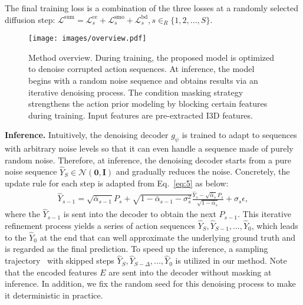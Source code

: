 \documentclass[10pt,twocolumn,letterpaper]{article}
\begin{document}
The final training loss is a combination of the three losses at a randomly selected diffusion step:
$\mathcal{L}^{\mathrm{sum}} = \mathcal{L}^{\mathrm{ce}}_s + \mathcal{L}^{\mathrm{smo}}_s + \mathcal{L}^{\mathrm{bd}}_s, s \in_R \{1,2,...,S\}$.






\begin{figure}[t]
\begin{center}
   \texttt{[image: images/overview.pdf]}
\end{center}
   \caption{Method overview. During training, the proposed model is optimized to denoise corrupted action sequences. At inference, the model begins with a random noise sequence and obtains results via an iterative denoising process. The condition masking strategy strengthens the action prior modeling by blocking certain features during training. Input features are pre-extracted I3D features.}
\label{fig:overview}
\end{figure}

\textbf{Inference.}
Intuitively, the denoising decoder $g_\psi$ is trained to adapt to sequences with arbitrary noise levels so that it can even handle a sequence made of purely random noise.
Therefore, at inference, the denoising decoder starts from a pure noise sequence ${\hat{Y}}_{S} \in \mathcal{N}(\boldsymbol{0}, \boldsymbol{I})$ and gradually reduces the noise.
Concretely, the update rule for each step is adapted from Eq.~\ref{eq:5} as below:
\begin{equation} \label{eq:12}
\begin{split}
{\hat{Y}}_{s-1} = \sqrt{\bar{\alpha}_{s-1}} P_s + \sqrt{1-\bar{\alpha}_{s-1} - \sigma_s^2} \frac{{\hat{Y}}_{s}-\sqrt{\bar{\alpha}_s} P_s}{\sqrt{1-\bar{\alpha}_s}} + \sigma_s \epsilon,
\end{split}
\end{equation}
where the $\hat{Y}_{s-1}$ is sent into the decoder to obtain the next $P_{s-1}$.
This iterative refinement process yields a series of action sequences $\hat{Y}_S, \hat{Y}_{S-1}, ..., \hat{Y}_0$, which leads to the $\hat{Y}_0$ at the end that can well approximate the underlying ground truth and is regarded as the final prediction.
To speed up the inference, a sampling trajectory~\cite{DDIM} with skipped steps ${\hat{Y}}_{S}, {\hat{Y}}_{S-\Delta}, ..., {\hat{Y}}_{0}$ is utilized in our method.
Note that the encoded features $E$ are sent into the decoder without masking at inference.
In addition, we fix the random seed for this denoising process to make it deterministic in practice.
\end{document}
